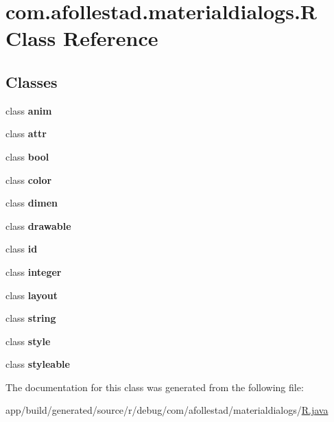 \hypertarget{classcom_1_1afollestad_1_1materialdialogs_1_1_r}{}\section{com.\+afollestad.\+materialdialogs.\+R Class Reference}
\label{classcom_1_1afollestad_1_1materialdialogs_1_1_r}
\subsection*{Classes}
\begin{DoxyCompactItemize}
\item 
class {\bfseries anim}
\item 
class {\bfseries attr}
\item 
class {\bfseries bool}
\item 
class {\bfseries color}
\item 
class {\bfseries dimen}
\item 
class {\bfseries drawable}
\item 
class {\bfseries id}
\item 
class {\bfseries integer}
\item 
class {\bfseries layout}
\item 
class {\bfseries string}
\item 
class {\bfseries style}
\item 
class {\bfseries styleable}
\end{DoxyCompactItemize}


The documentation for this class was generated from the following file\+:\begin{DoxyCompactItemize}
\item 
app/build/generated/source/r/debug/com/afollestad/materialdialogs/\hyperlink{app_2build_2generated_2source_2r_2debug_2com_2afollestad_2materialdialogs_2_r_8java}{R.\+java}\end{DoxyCompactItemize}

